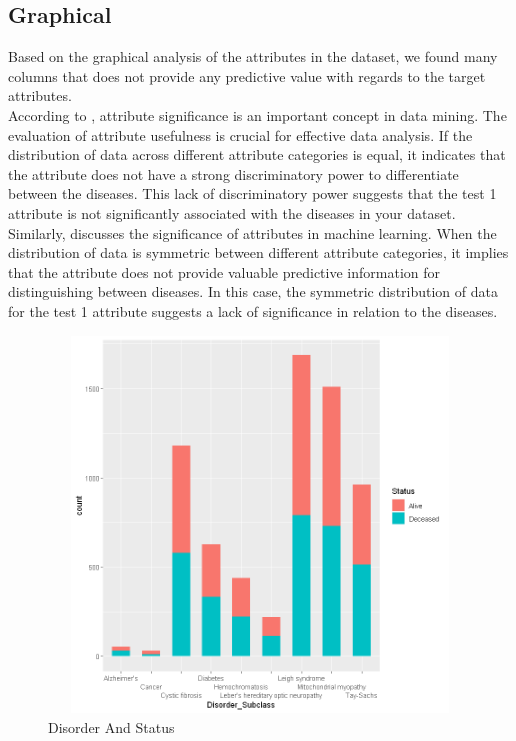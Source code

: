 \subsection{Graphical}
Based on the graphical analysis of the attributes in the dataset, we found many columns that does not provide any predictive value with regards to the target attributes.\\
\noindent
According to \cite{han2011data}, attribute significance is an important concept in data mining. The evaluation of attribute usefulness is crucial for effective data analysis. If the distribution of data across different attribute categories is equal, it indicates that the attribute does not have a strong discriminatory power to differentiate between the diseases. This lack of discriminatory power suggests that the test 1 attribute is not significantly associated with the diseases in your dataset.\\
\noindent
Similarly, \cite{mitchell1997machine} discusses the significance of attributes in machine learning. When the distribution of data is symmetric between different attribute categories, it implies that the attribute does not provide valuable predictive information for distinguishing between diseases. In this case, the symmetric distribution of data for the test 1 attribute suggests a lack of significance in relation to the diseases.\\

\begin{figure}[htpb]
	\centering
	\includegraphics[height=10cm, width=12cm]{figures/Status.png}
	\caption{Disorder And Status}
	\label{fig 4}
\end{figure}

